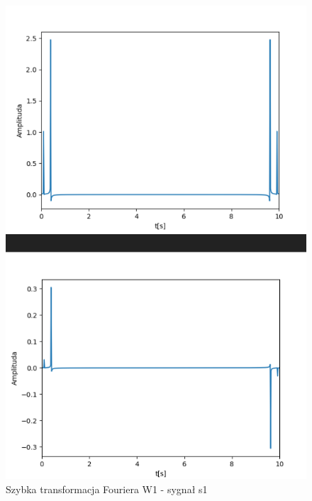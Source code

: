 \documentclass[12pt]{article}
\begin{document}
\begin{figure}[H]
\centering
\includegraphics[scale=0.6]{s1FastW1.png}
\caption{Szybka transformacja Fouriera W1 - sygnał s1}
\end{figure}
\end{document}
